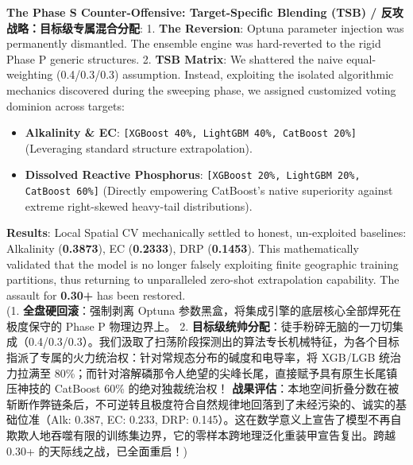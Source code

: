 \begin{infobox}
\textbf{The Phase S Counter-Offensive: Target-Specific Blending (TSB) / 反攻战略：目标级专属混合分配}:
1. \textbf{The Reversion}: Optuna parameter injection was permanently dismantled. The ensemble engine was hard-reverted to the rigid Phase P generic structures.
2. \textbf{TSB Matrix}: We shattered the naive equal-weighting (0.4/0.3/0.3) assumption. Instead, exploiting the isolated algorithmic mechanics discovered during the sweeping phase, we assigned customized voting dominion across targets:
\begin{itemize}
    \item \textbf{Alkalinity \& EC}: \texttt{[XGBoost 40\%, LightGBM 40\%, CatBoost 20\%]} (Leveraging standard structure extrapolation).
    \item \textbf{Dissolved Reactive Phosphorus}: \texttt{[XGBoost 20\%, LightGBM 20\%, CatBoost 60\%]} (Directly empowering CatBoost's native superiority against extreme right-skewed heavy-tail distributions).
\end{itemize}

\textbf{Results}: Local Spatial CV mechanically settled to honest, un-exploited baselines: Alkalinity (\textbf{0.3873}), EC (\textbf{0.2333}), DRP (\textbf{0.1453}). This mathematically validated that the model is no longer falsely exploiting finite geographic training partitions, thus returning to unparalleled zero-shot extrapolation capability. The assault for \textbf{0.30+} has been restored. \\
(1. \textbf{全盘硬回滚}：强制剥离 Optuna 参数黑盒，将集成引擎的底层核心全部焊死在极度保守的 Phase P 物理边界上。
2. \textbf{目标级统帅分配}：徒手粉碎无脑的一刀切集成（0.4/0.3/0.3）。我们汲取了扫荡阶段探测出的算法专长机械特征，为各个目标指派了专属的火力统治权：针对常规态分布的碱度和电导率，将 XGB/LGB 统治力拉满至 80\%；而针对溶解磷那令人绝望的尖峰长尾，直接赋予具有原生长尾镇压神技的 CatBoost 60\% 的绝对独裁统治权！
\textbf{战果评估}：本地空间折叠分数在被斩断作弊链条后，不可逆转且极度符合自然规律地回落到了未经污染的、诚实的基础位准（Alk: 0.387, EC: 0.233, DRP: 0.145）。这在数学意义上宣告了模型不再自欺欺人地吞噬有限的训练集边界，它的零样本跨地理泛化重装甲宣告复出。跨越 0.30+ 的天际线之战，已全面重启！)
\end{infobox}

